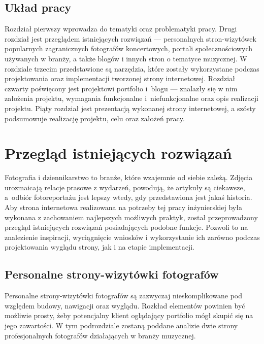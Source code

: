 \documentclass[a4paper, 12pt, twoside]{article}
\numberwithin{figure}{section}
\begin{document}
\begin{sloppypar}

\subsection{Układ pracy}

Rozdział pierwszy wprowadza do tematyki oraz problematyki pracy. Drugi rozdział jest przeglądem istniejących rozwiązań --- personalnych stron-wizytówek popularnych zagranicznych fotografów koncertowych, portali społecznościowych używanych w branży, a także blogów i innych stron o tematyce muzycznej. W rozdziale trzecim przedstawione są narzędzia, które zostały wykorzystane podczas projektowania oraz implementacji tworzonej strony internetowej. Rozdział czwarty poświęcony jest projektowi portfolio i~blogu --- znalazły się w nim założenia projektu, wymagania funkcjonalne i~niefunkcjonalne oraz opis realizacji projektu. Piąty rozdział jest prezentacją wykonanej strony internetowej, a szósty podsumowuje realizację projektu, celu oraz założeń pracy.


\newpage

\section{Przegląd istniejących rozwiązań} \label{przeglad}

Fotografia i dziennikarstwo to branże, które wzajemnie od siebie zależą. Zdjęcia urozmaicają relacje prasowe z wydarzeń, powodują, że artykuły są ciekawsze, a~odbiór fotoreportażu jest lepszy wtedy, gdy przedstawiona jest jakaś historia. Aby strona internetowa realizowana na potrzeby tej pracy inżynierskiej była wykonana z zachowaniem najlepszych możliwych praktyk, został przeprowadzony przegląd istniejących rozwiązań posiadających podobne funkcje. Pozwoli to na znalezienie inspiracji, wyciągnięcie wniosków i wykorzystanie ich zarówno podczas projektowania wyglądu strony, jak i na etapie implementacji.


\subsection{Personalne strony-wizytówki fotografów}

Personalne strony-wizytówki fotografów są zazwyczaj nieskomplikowane pod względem budowy, nawigacji oraz wyglądu. Rozkład elementów powinien być możliwie prosty, żeby potencjalny klient oglądający portfolio mógł skupić się na jego zawartości. W tym podrozdziale zostaną poddane analizie dwie strony profesjonalnych fotografów działających w branży muzycznej.


\end{sloppypar}
\end{document}
